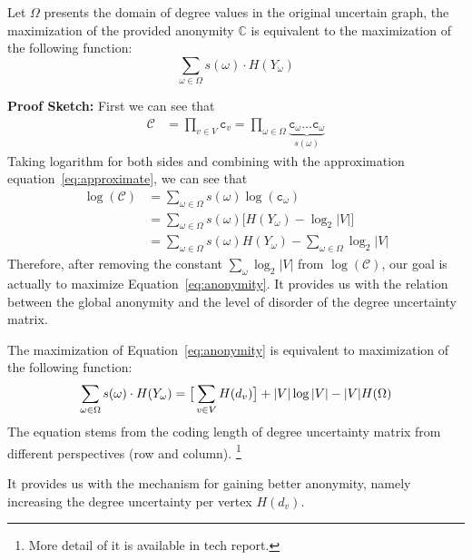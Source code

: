 \begin{lemma}
Let $\Omega$ presents the domain of degree values in the original uncertain graph, the maximization of the provided anonymity $\mathbb{C}$ is equivalent to the maximization of the following function:
  \begin{equation}
      \sum_{\omega \in \Omega} s(\omega) \cdot H(Y_{\omega}) 
      \label{eq:anonymity}
  \end{equation} 
\end{lemma}

{\bf Proof Sketch:} First we can see that 
\begin{align*}
    \mathcal{C} &= \prod_{v \in V} \mathtt{c}_{v} 
                 = \prod_{\omega \in \Omega} \underbrace{\mathtt{c_{\omega}} \ldots \mathtt{c}_{\omega}}_{s(\omega)} 
\end{align*}
Taking logarithm for both sides and combining with the approximation equation~\ref{eq:approximate}, we can see that 
\begin{align*}
    \log(\mathcal{C}) &=\sum_{\omega \in \Omega} s(\omega) \log(\mathtt{c_{\omega}}) \\
                      &=\sum_{\omega \in \Omega} s(\omega) \big[ H(Y_{\omega})-\log_{2}{|V|} \big] \\
                      &=\sum_{\omega  \in \Omega} s(\omega) H(Y_{\omega}) -\sum_{\omega  \in \Omega} \log_{2}{|V|}
\end{align*}
Therefore, after removing the constant $\sum_{\omega} \log_{2}|V|$ from $\log(\mathcal{C})$, our goal is actually to maximize Equation~\ref{eq:anonymity}. It provides us with the relation between the global anonymity and the level of disorder of the degree uncertainty matrix.  

\begin{lemma}
The maximization of Equation~\ref{eq:anonymity} is equivalent to maximization of the following function:
  \begin{equation}
      \small{\sum_{\omega \in \Omega} s(\omega) \cdot H(Y_{\omega}) =\big[ \sum_{v \in V} H(d_{v})\big] + |V|\log{|V|}-|V|H(\Omega)}
  \end{equation}
The equation stems from the coding length of degree uncertainty matrix from different perspectives (row and column).
\footnote{More detail of it is available in tech report.}
\end{lemma}
It provides us with the mechanism for gaining better anonymity, namely increasing the degree uncertainty per vertex $H(d_{v})$. 

